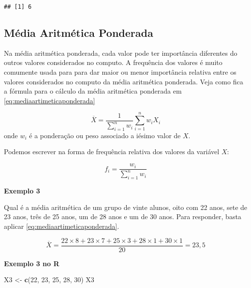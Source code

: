 \documentclass[
]{book}
\newenvironment{Shaded}{\begin{snugshade}}{\end{snugshade}}
\newcommand{\DecValTok}[1]{\textcolor[rgb]{0.00,0.00,0.81}{#1}}
\newcommand{\KeywordTok}[1]{\textcolor[rgb]{0.13,0.29,0.53}{\textbf{#1}}}
\newcommand{\NormalTok}[1]{#1}
\newcommand{\StringTok}[1]{\textcolor[rgb]{0.31,0.60,0.02}{#1}}
\begin{document}
\begin{verbatim}
## [1] 6
\end{verbatim}

\hypertarget{muxe9dia-aritmuxe9tica-ponderada}{%
\subsection{Média Aritmética Ponderada}\label{muxe9dia-aritmuxe9tica-ponderada}}

Na média aritmética ponderada, cada valor pode ter importância diferentes do outros valores considerados no computo. A frequência dos valores é muito comumente usada para para dar maior ou menor importância relativa entre os valores considerados no computo da média aritmética ponderada. Veja como fica a fórmula para o cálculo da média aritmética ponderada em \eqref{eq:mediaartimeticaponderada}

\begin{equation}
    \overline{X} = \frac{1}{\sum_{i=1}^{n}w_i} \sum_{i=1}^{n} w_i X_i
    \label{eq:mediaartimeticaponderada}
\end{equation}
onde \(w_i\) é a ponderação ou peso associado a iésimo valor de \(X\).

Podemos escrever na forma de frequência relativa dos valores da variável \(X\):

\begin{equation}
  f_i = \frac{w_i}{\sum_{i=1}^{n}w_i}
  \label{eq:eq13}
\end{equation}

\textbf{Exemplo 3}

Qual é a média aritmética de um grupo de vinte alunos, oito com 22 anos, sete
de 23 anos, três de 25 anos, um de 28 anos e um de 30 anos. Para responder,
basta aplicar \eqref{eq:mediaartimeticaponderada}.

\begin{equation*}
  \overline{X} = \frac{22\times 8 + 23\times 7 + 25 \times 3 + 28 \times 1 + 
  30 \times 1}{20} = 23,5
\end{equation*}

\textbf{Exemplo 3 no R}

\begin{Shaded}
\begin{Highlighting}[]
\NormalTok{X3 <-}\StringTok{ }\KeywordTok{c}\NormalTok{(}\DecValTok{22}\NormalTok{, }\DecValTok{23}\NormalTok{, }\DecValTok{25}\NormalTok{, }\DecValTok{28}\NormalTok{, }\DecValTok{30}\NormalTok{)}
\NormalTok{X3}
\end{Highlighting}
\end{Shaded}
\end{document}

